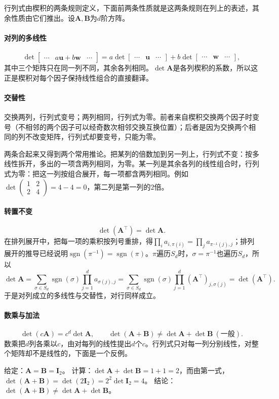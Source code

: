 行列式由楔积的两条规则定义，下面前两条性质就是这两条规则在列上的表述，其余性质由它们推出。设$\bm A,\bm B$为$d$阶方阵。

\paragraph{对列的多线性}
\[
 \det\begin{bmatrix}\cdots&a\bm u+b\bm w&\cdots\end{bmatrix}
 =a\det\begin{bmatrix}\cdots&\bm u&\cdots\end{bmatrix}
 +b\det\begin{bmatrix}\cdots&\bm w&\cdots\end{bmatrix},
\]
其中三个矩阵只在同一列不同，其余各列相同。$\det\bm A$是各列楔积的系数，所以这正是楔积对每个因子保持线性组合的直接翻译。

\paragraph{交替性}
交换两列，行列式变号；两列相同，行列式为零。前者来自楔积交换两个因子时变号（不相邻的两个因子可以经奇数次相邻交换互换位置）；后者是因为交换两个相同的列不改变矩阵，行列式却要变号，只能为零。

两条合起来又得到两个常用推论。把某列的倍数加到另一列上，行列式不变：按多线性拆开，多出的一项含两列相同，为零。某一列是其余各列的线性组合时，行列式为零：把这一列按组合展开，每一项都含两列相同。例如$\det\left(\begin{smallmatrix}1&2\\2&4\end{smallmatrix}\right)=4-4=0$，第二列是第一列的$2$倍。

\paragraph{转置不变}
\[
 \det(\bm A^\top)=\det\bm A.
\]
在排列展开中，把每一项的乘积按列号重排，得$\prod_ia_{i,\pi(i)}=\prod_ja_{\pi^{-1}(j),j}$；排列展开的推导已经说明$\operatorname{sgn}(\pi^{-1})=\operatorname{sgn}(\pi)$。$\pi$遍历$S_d$时，$\sigma=\pi^{-1}$也遍历$S_d$，所以
\[
 \det\bm A=\sum_{\sigma\in S_d}\operatorname{sgn}(\sigma)\prod_{j=1}^da_{\sigma(j),j}
 =\sum_{\sigma\in S_d}\operatorname{sgn}(\sigma)\prod_{j=1}^d(\bm A^\top)_{j,\sigma(j)}
 =\det(\bm A^\top).
\]
于是对列成立的多线性与交替性，对行同样成立。

\paragraph{数乘与加法}
\[
 \det(c\bm A)=c^d\det\bm A,\qquad
 \det(\bm A+\bm B)\neq\det\bm A+\det\bm B\ (\text{一般}).
\]
数乘把$d$列各乘以$c$，由对每列的线性提出$d$个$c$。行列式只对每一列分别线性，对整个矩阵却不是线性的，下面是一个反例。
\begin{example}[反例：行列式不保持加法]
\label{ex:ls-det-not-additive}
给定：$\bm A=\bm B=\bm I_2$。
计算：$\det\bm A+\det\bm B=1+1=2$，而由第一式，$\det(\bm A+\bm B)=\det(2\bm I_2)=2^2\det\bm I_2=4$。
结论：$\det(\bm A+\bm B)\neq\det\bm A+\det\bm B$。
\end{example}

